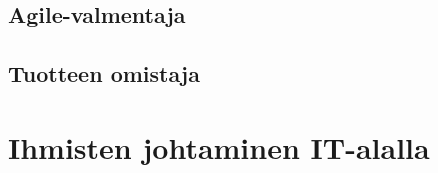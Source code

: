 \documentclass[a4paper]{article}
\begin{document}
\subsection{Agile-valmentaja}



\subsection{Tuotteen omistaja}












\section{Ihmisten johtaminen IT-alalla}



\citep{grosjean2010}
\citep{appelo2012}
\citep{rsaanimate}
\citep{adkins2010}
\citep{augustine2005}
\citep{mcconnell1996}



\end{document}
